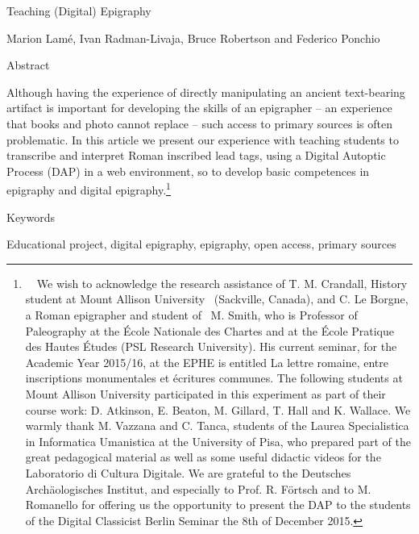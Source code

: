 \documentclass[amsthm,ebook]{saparticle}
\title{}
\author{Marion Lamé}
\date{2015-12-02}
\begin{document}
Teaching (Digital) Epigraphy

Marion Lamé, Ivan Radman-Livaja, Bruce Robertson and Federico Ponchio

Abstract

Although having the experience of directly manipulating an ancient text-bearing artifact is important for developing the
skills of an epigrapher – an experience that books and photo cannot replace – such access to primary sources is often
problematic. In this article we present our experience with teaching students to transcribe and interpret Roman
inscribed lead tags, using a Digital Autoptic Process (DAP) in a web environment, so to develop basic competences in
epigraphy and digital epigraphy.\footnote{\par \ \  We wish to acknowledge the research assistance of T. M. Crandall,
History student at Mount Allison University \ (Sackville, Canada), and C. Le Borgne, a Roman epigrapher and student of
\ M. Smith, who is Professor of Paleography at the École Nationale des Chartes and at the École Pratique des Hautes
Études (PSL Research University). His current seminar, for the Academic Year 2015/16, at the EPHE is entitled
{\textquotedbl}La lettre romaine, entre inscriptions monumentales et écritures communes{\textquotedbl}. The following
students at Mount Allison University participated in this experiment as part of their course work: D. Atkinson, E.
Beaton, M. Gillard, T. Hall and K. Wallace. We warmly thank M. Vazzana and C. Tanca, students of the Laurea
Specialistica in Informatica Umanistica at the University of Pisa, who prepared part of the great pedagogical material
as well as some useful didactic videos for the Laboratorio di Cultura Digitale. We are grateful to the Deutsches
Archäologisches Institut, and especially to Prof. R. Förtsch and to M. Romanello for offering us the opportunity to
present the DAP to the students of the Digital Classicist Berlin Seminar the 8th of December 2015.}

Keywords

Educational project, digital epigraphy, epigraphy, open access, primary sources
\end{document}
